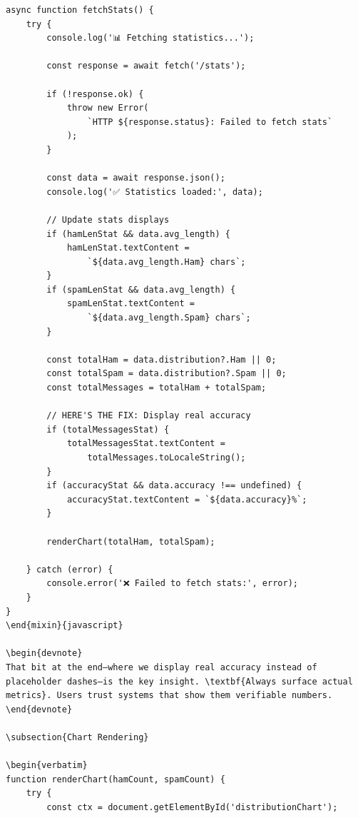 \documentclass[12pt, a4paper]{article}
\begin{document}
\begin{verbatim}
async function fetchStats() {
    try {
        console.log('📊 Fetching statistics...');
        
        const response = await fetch('/stats');
        
        if (!response.ok) {
            throw new Error(
                `HTTP ${response.status}: Failed to fetch stats`
            );
        }
        
        const data = await response.json();
        console.log('✅ Statistics loaded:', data);
        
        // Update stats displays
        if (hamLenStat && data.avg_length) {
            hamLenStat.textContent = 
                `${data.avg_length.Ham} chars`;
        }
        if (spamLenStat && data.avg_length) {
            spamLenStat.textContent = 
                `${data.avg_length.Spam} chars`;
        }
        
        const totalHam = data.distribution?.Ham || 0;
        const totalSpam = data.distribution?.Spam || 0;
        const totalMessages = totalHam + totalSpam;
        
        // HERE'S THE FIX: Display real accuracy
        if (totalMessagesStat) {
            totalMessagesStat.textContent = 
                totalMessages.toLocaleString();
        }
        if (accuracyStat && data.accuracy !== undefined) {
            accuracyStat.textContent = `${data.accuracy}%`;
        }
        
        renderChart(totalHam, totalSpam);
        
    } catch (error) {
        console.error('❌ Failed to fetch stats:', error);
    }
}
\end{mixin}{javascript}

\begin{devnote}
That bit at the end—where we display real accuracy instead of placeholder dashes—is the key insight. \textbf{Always surface actual metrics}. Users trust systems that show them verifiable numbers.
\end{devnote}

\subsection{Chart Rendering}

\begin{verbatim}
function renderChart(hamCount, spamCount) {
    try {
        const ctx = document.getElementById('distributionChart');
        

\end{verbatim}
\end{document}
